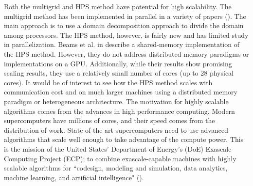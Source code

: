Both the multigrid and HPS method have potential for high scalability. The multigrid method has been implemented in parallel in a variety of papers (\cite{bergen2006massively}). The main approach is to use a domain decomposition approach to divide the domain among processors. The HPS method, however, is fairly new and has limited study in parallelization. Beams et al. in \cite{beams2020parallel} describe a shared-memory implementation of the HPS method. However, they do not address distributed memory paradigms or implementations on a GPU. Additionally, while their results show promising scaling results, they use a relatively small number of cores (up to 28 physical cores). It would be of interest to see how the HPS method scales with communication cost and on much larger machines using a distributed memory paradigm or heterogeneous architecture. The motivation for highly scalable algorithms comes from the advances in high performance computing. Modern supercomputers have millions of cores, and their speed comes from the distribution of work. State of the art supercomputers need to use advanced algorithms that scale well enough to take advantage of the compute power. This is the mission of the United States' Department of Energy's (DoE) Exascale Computing Project (ECP); to combine exascale-capable machines with highly scalable algorithms for ``codesign, modeling and simulation, data analytics, machine learning, and artificial intelligence" (\cite{doe2021exascale}).
